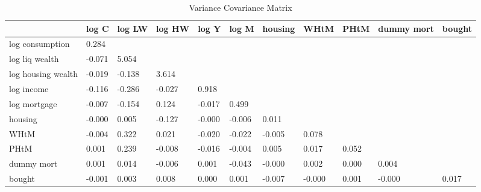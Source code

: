 \begin{table}[htbp]
\caption{\label{clabel} Variance Covariance Matrix}\centering\medskip
\begin{tabular}{lllllllllll} \hline \hline
 & log C  & log LW  & log HW  & log Y  & log M  & housing  & WHtM  & PHtM  & dummy mort  & bought  \\  \hline 
log consumption &     0.284 \\  
log liq wealth &    -0.071 &     5.054 \\  
log housing wealth &    -0.019 &    -0.138 &     3.614 \\  
log income &    -0.116 &    -0.286 &    -0.027 &     0.918 \\  
log mortgage &    -0.007 &    -0.154 &     0.124 &    -0.017 &     0.499 \\  
housing &    -0.000 &     0.005 &    -0.127 &    -0.000 &    -0.006 &     0.011 \\  
WHtM &    -0.004 &     0.322 &     0.021 &    -0.020 &    -0.022 &    -0.005 &     0.078 \\  
PHtM &     0.001 &     0.239 &    -0.008 &    -0.016 &    -0.004 &     0.005 &     0.017 &     0.052 \\  
dummy mort &     0.001 &     0.014 &    -0.006 &     0.001 &    -0.043 &    -0.000 &     0.002 &     0.000 &     0.004 \\  
bought &    -0.001 &     0.003 &     0.008 &     0.000 &     0.001 &    -0.007 &    -0.000 &     0.001 &    -0.000 &     0.017 \\  
\hline \hline \end{tabular}
\end{table}
